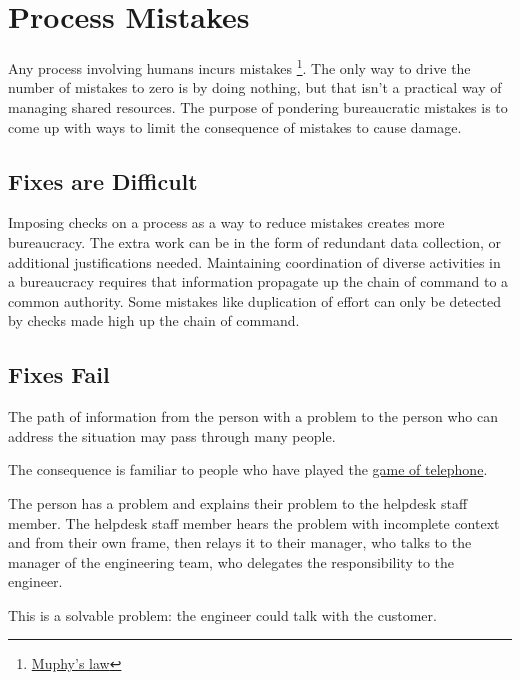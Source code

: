 \section{Process Mistakes\label{sec:process-mistakes}}

Any process involving humans incurs mistakes
\footnote{\href{https://en.wikipedia.org/wiki/Murphy\%27s_law}{Muphy's law}
}. The only way to drive the number of mistakes to zero is by doing nothing, but that isn't a practical way of managing shared resources. 
The purpose of pondering bureaucratic mistakes is to come up with ways to limit the consequence of mistakes to cause damage. 

\subsection*{Fixes are Difficult}
Imposing checks on a process as a way to  reduce mistakes creates more bureaucracy. The extra work can be in the form of redundant data collection, or additional justifications needed. 
Maintaining coordination of diverse activities in a bureaucracy requires that information propagate up the chain of command to a common authority. Some mistakes like duplication of effort can only be detected by checks made high up the chain of command.


\subsection*{Fixes Fail}
The path of information from the person with a problem to the person who can address the situation may pass through many people. 

The consequence is familiar to people who have played the \href{https://en.wikipedia.org/wiki/Chinese_whispers\%23Game}{game of telephone}.
\begin{mdframed}
The person has a problem and explains their problem to the helpdesk staff member. The helpdesk staff member hears the problem with incomplete context and from their own frame, then relays it to their manager, who talks to the manager of the engineering team, who delegates the responsibility to the engineer. 
\end{mdframed}
This is a solvable problem: the engineer could talk with the customer. 

